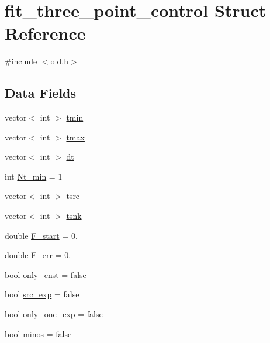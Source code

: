 \hypertarget{structfit__three__point__control}{}\section{fit\+\_\+three\+\_\+point\+\_\+control Struct Reference}
\label{structfit__three__point__control}


{\ttfamily \#include $<$old.\+h$>$}

\subsection*{Data Fields}
\begin{DoxyCompactItemize}
\item 
vector$<$ int $>$ \mbox{\hyperlink{structfit__three__point__control_a7a303ea670e0ec622f1897fbcc618f38}{tmin}}
\item 
vector$<$ int $>$ \mbox{\hyperlink{structfit__three__point__control_a3a9485d49baab0557f44d449a036b311}{tmax}}
\item 
vector$<$ int $>$ \mbox{\hyperlink{structfit__three__point__control_a7095b5667af721d74a5a47902ba40f79}{dt}}
\item 
int \mbox{\hyperlink{structfit__three__point__control_acf15e7eec21217afa95b956a50f30ad1}{Nt\+\_\+min}} = 1
\item 
vector$<$ int $>$ \mbox{\hyperlink{structfit__three__point__control_a7d975f944e1ff4a729248b4a1d74c734}{tsrc}}
\item 
vector$<$ int $>$ \mbox{\hyperlink{structfit__three__point__control_ae2fb8007be1d25b7a8b70a6f4f697629}{tsnk}}
\item 
double \mbox{\hyperlink{structfit__three__point__control_ae72fbe418eeb38a2e2504038fef882e2}{F\+\_\+start}} = 0.
\item 
double \mbox{\hyperlink{structfit__three__point__control_a2a82b193d66630ab73f5c92a990096a2}{F\+\_\+err}} = 0.
\item 
bool \mbox{\hyperlink{structfit__three__point__control_aa572db8aaff918b9e2c1a24da1100833}{only\+\_\+cnst}} = false
\item 
bool \mbox{\hyperlink{structfit__three__point__control_acb6c8669dfcd84a16f522570bb267c96}{src\+\_\+exp}} = false
\item 
bool \mbox{\hyperlink{structfit__three__point__control_a2a645c2132a1813ac6d95a94898fdb9f}{only\+\_\+one\+\_\+exp}} = false
\item 
bool \mbox{\hyperlink{structfit__three__point__control_af1cd4479a1461ee340bbf94e94f50404}{minos}} = false

\end{DoxyCompactItemize}
